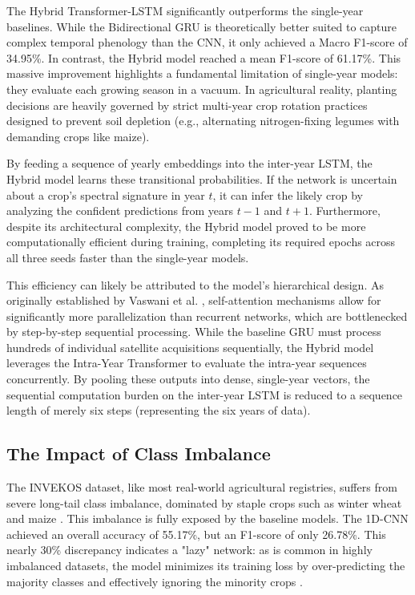 The Hybrid Transformer-LSTM significantly outperforms the single-year baselines.
While the Bidirectional GRU is theoretically better suited to capture complex temporal phenology than the CNN, it only achieved a Macro F1-score of 34.95\%.
In contrast, the Hybrid model reached a mean F1-score of 61.17\%.
This massive improvement highlights a fundamental limitation of single-year models: they evaluate each growing season in a vacuum.
In agricultural reality, planting decisions are heavily governed by strict multi-year crop rotation practices designed
to prevent soil depletion (e.g., alternating nitrogen-fixing legumes with demanding crops like maize).

By feeding a sequence of yearly embeddings into the inter-year LSTM, the Hybrid model learns these transitional probabilities.
If the network is uncertain about a crop's spectral signature in year $t$, it can infer the likely crop by analyzing the confident predictions from years $t-1$ and $t+1$. 
Furthermore, despite its architectural complexity, the Hybrid model proved to be more computationally efficient during training,
completing its required epochs across all three seeds faster than the single-year models.

This efficiency can likely be attributed to the model's hierarchical design.
As originally established by Vaswani et al. \cite{attention_is_all_you_need},
self-attention mechanisms allow for significantly more parallelization than recurrent networks, which are bottlenecked by step-by-step sequential processing.
While the baseline GRU must process hundreds of individual satellite acquisitions sequentially,
the Hybrid model leverages the Intra-Year Transformer to evaluate the intra-year sequences concurrently.
By pooling these outputs into dense, single-year vectors, the sequential computation burden on the inter-year LSTM is reduced
to a sequence length of merely six steps (representing the six years of data).

\subsection{The Impact of Class Imbalance}
\label{subsec:class_imbalance}

The INVEKOS dataset, like most real-world agricultural registries, suffers from severe long-tail class imbalance,
dominated by staple crops such as winter wheat and maize \cite{perantoni_bayesian_2024}.
This imbalance is fully exposed by the baseline models.
The 1D-CNN achieved an overall accuracy of 55.17\%, but an F1-score of only 26.78\%.
This nearly 30\% discrepancy indicates a "lazy" network: as is common in highly imbalanced datasets,
the model minimizes its training loss by over-predicting the majority classes and effectively ignoring the minority crops \cite{johnson2019survey}.


